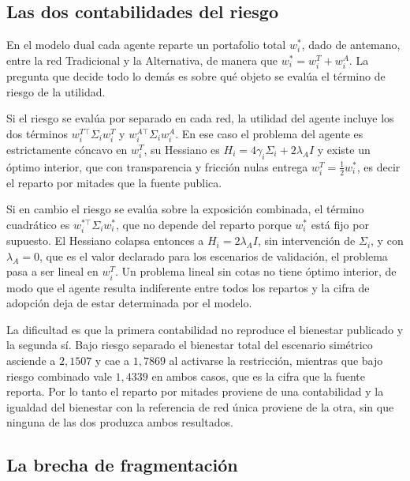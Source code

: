 \subsection{Las dos contabilidades del riesgo}
\label{anexo:dual-contabilidades}

En el modelo dual cada agente reparte un portafolio total $w_i^{*}$, dado de
antemano, entre la red Tradicional y la Alternativa, de manera que
$w_i^{*} = w_i^{T} + w_i^{A}$. La pregunta que decide todo lo demás es sobre qué
objeto se evalúa el término de riesgo de la utilidad.

Si el riesgo se evalúa por separado en cada red, la utilidad del agente incluye
los dos términos $w_i^{T\top}\Sigma_i w_i^{T}$ y $w_i^{A\top}\Sigma_i w_i^{A}$.
En ese caso el problema del agente es estrictamente cóncavo en $w_i^{T}$, su
Hessiano es $H_i = 4\gamma_i\Sigma_i + 2\lambda_A I$ y existe un óptimo interior,
que con transparencia y fricción nulas entrega $w_i^{T} = \tfrac{1}{2}w_i^{*}$,
es decir el reparto por mitades que la fuente publica.

Si en cambio el riesgo se evalúa sobre la exposición combinada, el término
cuadrático es $w_i^{*\top}\Sigma_i w_i^{*}$, que no depende del reparto porque
$w_i^{*}$ está fijo por supuesto. El Hessiano colapsa entonces a
$H_i = 2\lambda_A I$, sin intervención de $\Sigma_i$, y con $\lambda_A = 0$, que
es el valor declarado para los escenarios de validación, el problema pasa a ser
lineal en $w_i^{T}$. Un problema lineal sin cotas no tiene óptimo interior, de
modo que el agente resulta indiferente entre todos los repartos y la cifra de
adopción deja de estar determinada por el modelo.

La dificultad es que la primera contabilidad no reproduce el bienestar publicado
y la segunda sí. Bajo riesgo separado el bienestar total del escenario simétrico
asciende a $2,1507$ y cae a $1,7869$ al activarse la restricción, mientras que
bajo riesgo combinado vale $1,4339$ en ambos casos, que es la cifra que la fuente
reporta. Por lo tanto el reparto por mitades proviene de una contabilidad y la
igualdad del bienestar con la referencia de red única proviene de la otra, sin
que ninguna de las dos produzca ambos resultados.

\subsection{La brecha de fragmentación}
\label{anexo:dual-brecha}

